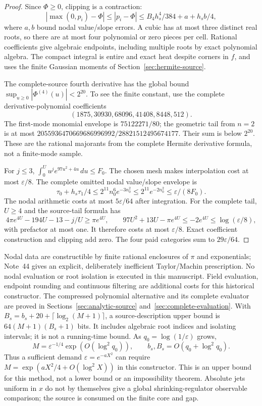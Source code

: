 \begin{proof}
Since $\Phi\ge0$, clipping is a contraction:
\[
 |\max(0,p_i)-\Phi|\le|p_i-\Phi|
                 \le B_4h_s^4/384+a+h_sb/4,
\]
where $a,b$ bound nodal value/slope errors. A cubic has at most three
distinct real roots, so there are at most four polynomial or zero pieces
per cell. Rational coefficients give algebraic endpoints, including
multiple roots by exact polynomial algebra. The compact integral is
entire and exact heat despite corners in $f$, and uses the finite
Gaussian moments of Section~\ref{sec:hermite-source}.

The complete-source fourth derivative has the global bound
$\sup_{u\ge0}|\Phi^{(4)}(u)|<2^{20}$. To see the finite constant, use
the complete derivative-polynomial coefficients
\[
 (1875,30930,68096,41408,8448,512).
\]
The first-mode monomial envelope
is $75122271/80$; the geometric tail from $n=2$ is at most
$2055936470669686996992/28821512495674177$. Their sum is below $2^{20}$.
These are the rational majorants from the complete Hermite derivative
formula, not a finite-mode sample.

For $j\le3$, $\int_0^Uu^je^{97u^2+4u}\,du\le F_0$. The chosen
mesh makes interpolation cost at most $\varepsilon/8$. The complete
omitted nodal value/slope envelope is
\[
 \tau_0+h_s\tau_1/4\le2^{11}n_0^6e^{-3n_0^2}
        \le2^{11}e^{-2n_0^2}\le\varepsilon/(8F_0).
\]
The nodal arithmetic costs at most $5\varepsilon/64$ after integration.
For the complete tail, $U\ge4$ and the source-tail formula has
\[
 4\pi e^{4U}-194U-13-j/U\ge\pi e^{4U},\qquad
 97U^2+13U-\pi e^{4U}\le-2e^{4U}\le\log(\varepsilon/8),
\]
with prefactor at most one. It therefore costs at most
$\varepsilon/8$. Exact coefficient construction and clipping add zero.
The four paid categories sum to $29\varepsilon/64$.
\end{proof}
Nodal data are constructible by finite rational enclosures of $\pi$ and
exponentials; Note~44 gives an explicit, deliberately inefficient
Taylor/Machin prescription. No nodal evaluation or root isolation is
executed in this manuscript. Field evaluation, endpoint rounding and
continuous filtering are additional costs for this historical constructor.
The compressed polynomial alternative and its complete evaluator are
proved in Sections~\ref{sec:analytic-source} and~\ref{sec:complete-evaluation}. With
$B_s=b_s+20+\lceil\log_2(M+1)\rceil$, a source-description upper bound
is $64(M+1)(B_s+1)$ bits. It includes algebraic root indices and isolating
intervals; it is not a running-time bound. As $q_0=\log(1/\varepsilon)$ grows,
\begin{equation}
 M=\varepsilon^{-1/4}\exp(O(\log^2q_0)),\qquad
 b_s,B_s=O(q_0+\log^2q_0).
 \label{eq:fi-cost}
\end{equation}
Thus a sufficient demand $\varepsilon=e^{-aX^2}$ can require
$M=\exp(aX^2/4+O(\log^2X))$ in this constructor. This is an upper
bound for this method, not a lower bound or an impossibility theorem.
Absolute jets uniform in $x$ do not by themselves give a global
shrinking-regulator observable comparison; the source is consumed on
the finite core and gap.

